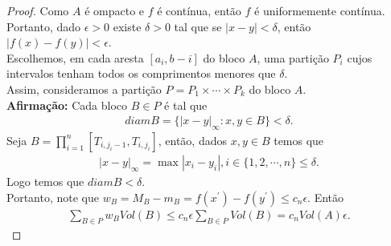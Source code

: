 \begin{proof} 
  Como $A$ é ompacto e $f$ é contínua, então $f$ é uniformemente contínua. Portanto, dado $\epsilon>0$ existe $\delta>0$ tal que se $|x-y|<\delta$, então $|f(x)-f(y)|<\epsilon$.\\
  Escolhemos, em cada aresta $[a_i,b-i]$ do bloco $A$, uma partição $P_i$ cujos intervalos tenham todos os comprimentos menores que $\delta$.\\
  Assim, consideramos a partição $P=P_1\times\cdots\times P_k$ do bloco $A$.\\
  \textbf{Afirmação:} Cada bloco $B\in P$ é tal que
  \begin{align*}
    diam B=\{|x-y|_{\infty}:x,y\in B\}<\delta.
  \end{align*}
  Seja $B=\prod_{i=1}^{n}[T_{i,j_i-1},T_{i,j_i}]$, então, dados $x,y\in B$ temos que
  \begin{align*}
    |x-y|_{\infty}=\max{|x_i-y_i|,i\in\{1,2,\cdots,n\}}\leq \delta.
  \end{align*}
  Logo temos que $diam B<\delta$.\\
  Portanto, note que $w_B=M_B-m_B=f(x^{\prime})-f(y^{\prime})\leq c_n\epsilon$. Então
  \begin{align*}
    \sum_{B\in P}w_B Vol(B)\leq c_n\epsilon\sum_{B\in P}Vol(B)=c_n Vol(A)\epsilon.
  \end{align*}
\end{proof}
